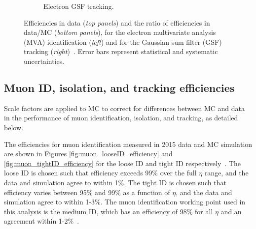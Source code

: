\begin{figure}[ht]
\begin{subfigure}{0.45\textwidth}
        \caption{Electron GSF tracking.}
        \label{fig:electron_GSF_tracking_efficiency}
    \end{subfigure}
    \caption[Efficiencies in data (\textit{top panels}) and the ratio of efficiencies in data/MC (\textit{bottom panels}), for the electron multivariate analysis (MVA) identification (\textit{left}) and for the Gaussian-sum filter (GSF) tracking (\textit{right}).]{Efficiencies in data (\textit{top panels}) and the ratio of efficiencies in data/MC (\textit{bottom panels}), for the electron multivariate analysis (MVA) identification (\textit{left}) and for the Gaussian-sum filter (GSF) tracking (\textit{right})~\cite{CMS-DP-2020-037}. Error bars represent statistical and systematic uncertainties.} 
\end{figure}


\subsection{Muon ID, isolation, and tracking efficiencies}
Scale factors are applied to MC to correct for differences between MC and data in the performance of muon identification, isolation, and tracking, as detailed below.

The efficiencies for muon identification measured in 2015 data and MC simulation are shown in Figures \ref{fig:muon_looseID_efficiency} and \ref{fig:muon_tightID_efficiency} for the loose ID and tight ID respectively~\cite{CMS-MUO-16-001}. The loose ID is chosen such that efficiency exceeds 99\% over the full $\eta$ range, and the data and simulation agree to within 1\%. The tight ID is chosen such that efficiency varies between 95\% and 99\% as a function of $\eta$, and the data and simulation agree to within 1-3\%. The muon identification working point used in this analysis is the medium ID, which has an efficiency of 98\% for all $\eta$ and an agreement within 1-2\%~\cite{CMS-MUO-16-001}. 

